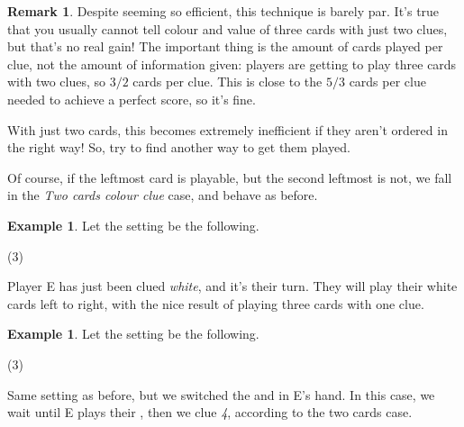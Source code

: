 \documentclass[a4paper]{article}
\theoremstyle{plain}
\theoremstyle{definition}
\newtheorem{remark}[theorem]{Remark}
\newtheorem{example}[theorem]{Example}
\begin{document}
\begin{remark}
	Despite seeming so efficient, this technique is barely par. It's true that you usually cannot tell colour and value of three cards with just two clues, but that's no real gain! The important thing is the amount of cards played per clue, not the amount of information given: players are getting to play three cards with two clues, so $3/2$ cards per clue. This is close to the $5/3$ cards per clue needed to achieve a perfect score, so it's fine.
	
	With just two cards, this becomes extremely inefficient if they aren't ordered in the right way! So, try to find another way to get them played. 
\end{remark}

Of course, if the leftmost card is playable, but the second leftmost is not, we fall in the \textit{Two cards colour clue} case, and behave as before.

\begin{example}
	
	Let the setting be the following.
	
	\begin{tasks}(3)
		\task[+]      
		\task[A]    
		\task[B]    
		\task[C]    
		\task[D]    
		\task[E]     
	\end{tasks}
	
	Player E has just been clued \textit{white}, and it's their turn. They will play their white cards left to right, with the nice result of playing three cards with one clue.
	
\end{example}

\begin{example}
	
	Let the setting be the following.
	
	\begin{tasks}(3)
		\task[+]      
		\task[A]    
		\task[B]    
		\task[C]    
		\task[D]    
		\task[E]    
	\end{tasks}
	
	Same setting as before, but we switched the  and  in E's hand. In this case, we wait until E plays their , then we clue \textit{4}, according to the two cards case.
	
\end{example}
\end{document}
